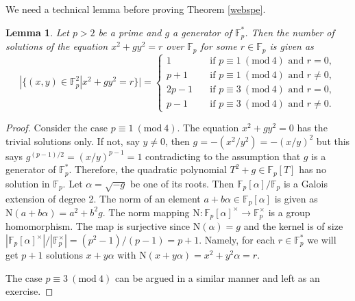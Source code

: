 \documentclass[12pt]{report}
\newtheorem{lemma}[theorem]{Lemma}
\theoremstyle{definition}
\newcommand{\mymod}[3]{#1 \equiv #2 \Mod{#3}}
\newcommand{\Mod}[1]{\ (\mathrm{mod}\ #1)}
\newcommand{\ff}{\mathbb{F}}
\newcommand{\nm}{\text{N}}
\begin{document}
We need a technical lemma before proving Theorem \ref{webspe}.

\begin{lemma}
	Let $p>2$ be a prime and $g$ a generator of $\ff_p^*$. Then the number of solutions of the equation $x^2+gy^2=r$ over $\ff_p$ for some $r\in \ff_p$ is given as
	\[ |\{(x,y)\in\ff_p^2|x^2+gy^2=r\}| =
		\begin{cases}
			1    & \quad \text{if } p\equiv 1\Mod{4} \text{ and } r=0,     \\
			p+1  & \quad \text{if } p\equiv 1\Mod{4} \text{ and } r\not=0, \\
			2p-1 & \quad \text{if } p\equiv 3\Mod{4} \text{ and } r=0,     \\
			p-1  & \quad \text{if } p\equiv 3\Mod{4} \text{ and } r\not=0.
		\end{cases}
	\]
\end{lemma}
\begin{proof}
	Consider the case $\mymod{p}{1}{4}$. The equation $x^2+gy^2=0$ has the trivial solutions only. If not, say $y\not=0$, then $g=-(x^2/y^2)=-(x/y)^2$ but this says $g^{(p-1)/2}=(x/y)^{p-1}=1$ contradicting to the assumption that $g$ is a generator of $\ff_p^*$. Therefore, the quadratic polynomial $T^2+g\in \ff_p[T]$ has no solution in $\ff_p$. Let $\alpha=\sqrt{-g}$ be one of its roots. Then $\ff_p[\alpha]/\ff_p$ is a Galois extension of degree 2. The norm of an element $a+b\alpha\in \ff_p[\alpha]$ is given as $\nm{(a+b\alpha)}=a^2+b^2g$. The norm mapping $\text{N}:\ff_p[\alpha]^\times\to \ff_p^\times$ is a group homomorphism. The map is surjective since $\nm{(\alpha)}=g$ and the kernel is of size $|\ff_p[\alpha]^\times|/ |\ff_p^\times|=(p^2-1)/(p-1)=p+1$. Namely, for each $r\in \ff_p^*$ we will get $p+1$ solutions $x+y\alpha$ with $\nm{(x+y\alpha)}=x^2+y^2\alpha=r$.


	The case $\mymod{p}{3}{4}$ can be argued in a similar manner and left as an exercise.
\end{proof}
\end{document}
